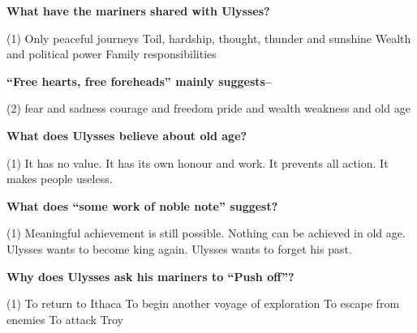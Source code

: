 \documentclass[12pt,a4paper]{exam}
\begin{document}
\begin{questions}
	\begin{minipage}{\textwidth}
		\question \textbf{What have the mariners shared with Ulysses?}

		\begin{tasks}(1)
			\task Only peaceful journeys
			\task Toil, hardship, thought, thunder and sunshine
			\task Wealth and political power
			\task Family responsibilities
		\end{tasks}
	\end{minipage}


	\begin{minipage}{\textwidth}
		\question \textbf{``Free hearts, free foreheads'' mainly suggests--}

		\begin{tasks}(2)
			\task fear and sadness
			\task courage and freedom
			\task pride and wealth
			\task weakness and old age
		\end{tasks}
	\end{minipage}


	\begin{minipage}{\textwidth}
		\question \textbf{What does Ulysses believe about old age?}

		\begin{tasks}(1)
			\task It has no value.
			\task It has its own honour and work.
			\task It prevents all action.
			\task It makes people useless.
		\end{tasks}
	\end{minipage}


	\begin{minipage}{\textwidth}
		\question \textbf{What does ``some work of noble note'' suggest?}

		\begin{tasks}(1)
			\task Meaningful achievement is still possible.
			\task Nothing can be achieved in old age.
			\task Ulysses wants to become king again.
			\task Ulysses wants to forget his past.
		\end{tasks}
	\end{minipage}


	\begin{minipage}{\textwidth}
		\question \textbf{Why does Ulysses ask his mariners to ``Push off''?}

		\begin{tasks}(1)
			\task To return to Ithaca
			\task To begin another voyage of exploration
			\task To escape from enemies
			\task To attack Troy
		\end{tasks}
	\end{minipage}

\end{questions}
\end{document}
